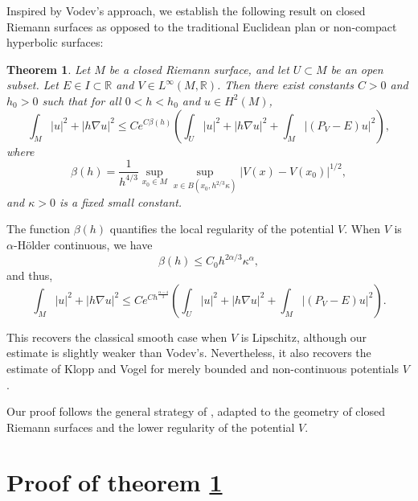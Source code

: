 \documentclass[leqno,11pt,letterpaper, english]{amsart}
\theoremstyle{plain}
\newtheorem{thm}{Theorem}
\theoremstyle{definition}
\numberwithin{equation}{section}
\begin{document}
Inspired by Vodev's approach, we establish the following result on closed Riemann surfaces as opposed to the traditional Euclidean plan or non-compact hyperbolic surfaces:
\begin{thm}
    \label{thm: mainthm}
    Let \( M \) be a closed Riemann surface, and let \( U \subset M \) be an open subset. Let \( E \in I \subset \mathbb{R} \) and \( V \in L^\infty(M, \mathbb{R}) \). Then there exist constants \( C > 0 \) and \( h_0 > 0 \) such that for all \( 0 < h < h_0 \) and \( u \in H^2(M) \),
    \begin{equation}
        \int_M |u|^2 + |h\nabla u|^2 \leq C e^{C\beta(h)} \left( \int_U |u|^2 + |h\nabla u|^2 + \int_M |(P_V - E)u|^2 \right),
    \end{equation}
    where
    \begin{equation}
        \beta(h) = \frac{1}{h^{4/3}} \sup_{x_0 \in M} \sup_{x \in B(x_0, h^{2/3} \kappa)} |V(x) - V(x_0)|^{1/2},
    \end{equation}
    and \( \kappa > 0 \) is a fixed small constant.
\end{thm}


The function \( \beta(h) \) quantifies the local regularity of the potential \( V \). When \( V \) is \( \alpha \)-H\"older continuous, we have
\[
\beta(h) \leq C_0 h^{2\alpha/3} \kappa^{\alpha},
\]
and thus,
\begin{equation}
    \int_M |u|^2 + |h\nabla u|^2 \leq C e^{C h^{\frac{\alpha - 4}{3}}} \left( \int_U |u|^2 + |h\nabla u|^2 + \int_M |(P_V - E)u|^2 \right). %
\end{equation}

This recovers the classical smooth case when \( V \) is Lipschitz, although our estimate is slightly weaker than Vodev's. Nevertheless, it also recovers the estimate of Klopp and Vogel for merely bounded and non-continuous potentials \( V \). 

Our proof follows the general strategy of \cite{vodevSemiclassicalResolventEstimates2020}, adapted to the geometry of closed Riemann surfaces and the lower regularity of the potential \( V \).


\section{Proof of theorem \ref{thm: mainthm}}
\end{document}
